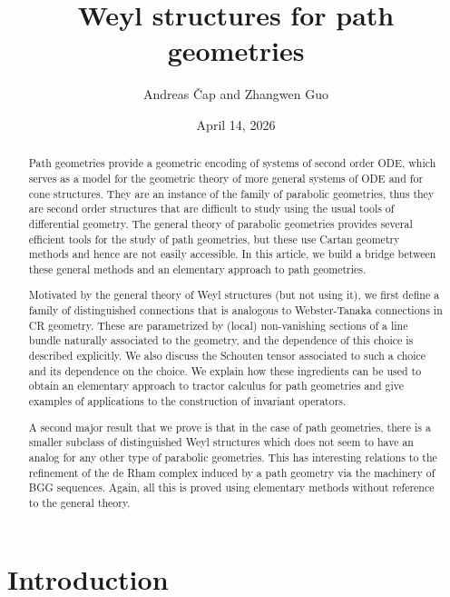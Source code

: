 \documentclass[11pt]{amsart}
\title{Weyl structures for path geometries}
\author{Andreas \v Cap and Zhangwen Guo}
\numberwithin{proposition}{section}
\numberwithin{equation}{section}
\begin{document}
\date{April 14, 2026}\onehalfspacing
\begin{abstract}
Path geometries provide a geometric encoding of systems of second order ODE, which serves as a model for the geometric theory of more general systems of ODE and for cone structures. They are an instance of the family of parabolic geometries, thus they are second order structures that are difficult to study using the usual tools of differential geometry. The general theory of parabolic geometries provides several efficient tools for the study of path geometries, but these use Cartan geometry methods and hence are not easily accessible. In this article, we build a bridge between these general methods and an elementary approach to path geometries. 

Motivated by the general theory of Weyl structures (but not using it), we first define a family of distinguished connections that is analogous to Webster-Tanaka connections in CR geometry. These are parametrized by (local) non-vanishing sections of a line bundle naturally associated to the geometry, and the dependence of this choice is described explicitly. We also discuss the Schouten tensor associated to such a choice and its dependence on the choice. We explain how these ingredients can be used to obtain an elementary approach to tractor calculus for path geometries and give examples of applications to the construction of invariant operators. 

A second major result that we prove is that in the case of path geometries, there is a smaller subclass of distinguished Weyl structures which does not seem to have an analog for any other type of parabolic geometries. This has interesting relations to the refinement of the de Rham complex induced by a path geometry via the machinery of BGG sequences. Again, all this is proved using elementary methods without reference to the general theory. 
\end{abstract}

    \maketitle 

\section{Introduction}
\end{document}
